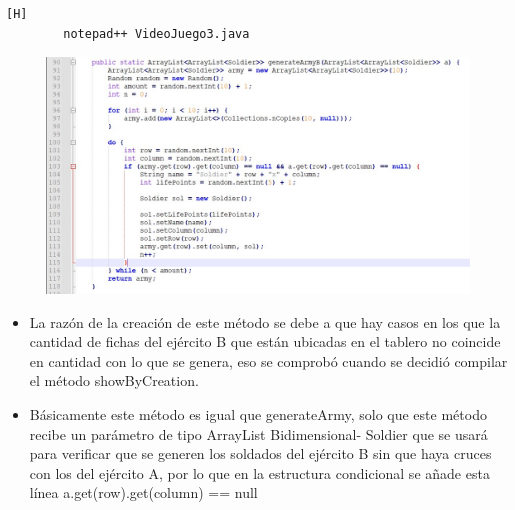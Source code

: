 \documentclass{article}
\begin{document}
	
	
	\begin{lstlisting}[language=bash,caption={Se implementa un método que genera un ArrayList para el ejército B}][H]
		notepad++ VideoJuego3.java
	\end{lstlisting}
	
	\begin{figure}[H]
		\centering
		\includegraphics[width=1.1\textwidth,keepaspectratio]{img/5.jpg}
	\end{figure}
	
	\begin{itemize}	
		\item La razón de la creación de este método se debe a que hay casos en los que la cantidad de fichas del ejército B que están ubicadas en el tablero no coincide en cantidad con lo que se genera, eso se comprobó cuando se decidió compilar el método showByCreation.
		\item Básicamente este método es igual que generateArmy, solo que este método recibe un parámetro de tipo ArrayList Bidimensional- Soldier que se usará para verificar que se generen los soldados del ejército B sin que haya cruces con los del ejército A, por lo que en la estructura condicional se añade esta línea a.get(row).get(column) == null 
	\end{itemize}
	
\end{document}
